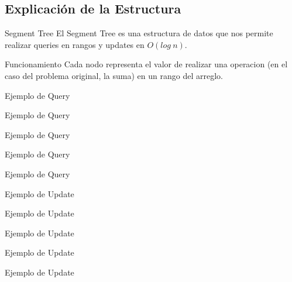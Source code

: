 \documentclass{beamer}
\begin{document}
\subsection{Explicación de la Estructura}
\begin{frame}{Segment Tree}
El Segment Tree es una estructura de datos que nos permite realizar queries en rangos y updates en $O(log\:n)$.
\pause



\end{frame}

\begin{frame}{Funcionamiento}
Cada nodo representa el valor de realizar una operacion (en el caso del problema original, la suma) en un rango del arreglo.


\end{frame}

\begin{frame}{Ejemplo de Query}

\end{frame}

\begin{frame}{Ejemplo de Query}

\end{frame}

\begin{frame}{Ejemplo de Query}

\end{frame}

\begin{frame}{Ejemplo de Query}

\end{frame}

\begin{frame}{Ejemplo de Query}

\end{frame}

\begin{frame}{Ejemplo de Update}

\end{frame}

\begin{frame}{Ejemplo de Update}

\end{frame}

\begin{frame}{Ejemplo de Update}

\end{frame}

\begin{frame}{Ejemplo de Update}

\end{frame}

\begin{frame}{Ejemplo de Update}

\end{frame}
\end{document}
